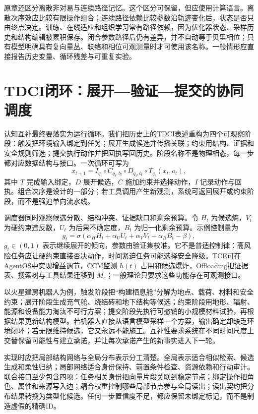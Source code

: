 原章还区分离散非对易与连续路径记忆。这个区分可保留，但应使用计算语言。离散次序效应比较有限操作组合；连续路径依赖比较参数沿轨迹变化后，状态是否只由终点决定。训练、在线适应和组织学习常有路径依赖，因为优化器状态、采样历史和结构编辑被累积保存。闭合参数路径后仍有差异，并不自动等于贝里相位；只有模型明确具有复向量丛、联络和相位可观测量时才可使用该名称。一般情形应直接报告历史变量、循环残差与可重复实验。

\section{TDCI闭环：展开—验证—提交的协同调度}
\label{sec:section_4727}

认知互补最终要落实为运行循环。我们把历史上的TDCI表述重构为四个可观察阶段：触发把环境输入绑定到任务；展开生成候选并传播关联；约束用结构、证据和安全规则筛选；提交执行动作并把回执写回历史。阶段名称不是物理相态，每一步都对应数据结构与接口。一次循环可写为
\[
x_{t+1}=I_{q_t}\circ C_{q_t,b_t}\circ D_{q_t,b_t}\circ T_{q_t}(x_t,o_t),
\]
其中 $T$ 完成输入绑定，$D$ 展开候选，$C$ 施加约束并选择动作，$I$ 记录动作与回执。组合次序是设计的一部分；若工具调用产生新观测，系统可返回展开或约束阶段，而不是强迫单向流水线。

调度器同时观察候选分散、结构冲突、证据缺口和剩余预算。令 $H_t$ 为候选熵，$V_t$ 为硬约束违反数，$U_t$ 为后果不确定度，$B_t$ 为归一化剩余预算。示例控制量为
\[
g_t=\sigma(\alpha_HH_t+\alpha_UU_t+\alpha_VV_t-\alpha_BB_t-\beta),
\]
$g_t\in(0,1)$ 表示继续展开的倾向，参数由验证集校准。它不是普适控制律：高风险任务应让硬约束直接否决动作，时间紧迫任务可能选择安全降级。TCE可在AgentOS中实现增益调节，CCM监测 $h(t)$ 占用和候选爆炸，Offloading把证据表、搜索树与工具结果迁移到 $M_e$；一般理论只要求这些功能存在可观测接口。

以火星建房机器人为例，触发阶段把“构建栖息舱”分解为地点、载荷、材料和安全约束；展开阶段生成充气舱、烧结砖和地下结构等候选；约束阶段用地形、辐射、能源和设备能力淘汰不可行方案；提交阶段先执行可撤销的小规模材料试验，再根据结果更新结构模型。若机器人直接从语言模型采样一个方案，输出确定却缺乏环境闭环；若无限维持候选，它又永远不能施工。互补性要求系统在不同时间尺度上交替保留可能性与建立承诺，并让每次承诺产生的新事实进入下一轮。

实现时应把局部结构网络与全局分布表示分工清楚。全局表示适合相似检索、候选生成和柔性归纳；局部网络适合身份保持、前置条件检查、资源依赖和行动审计。联合接口至少包含四项：任务相关身份把向量片段关联到稳定节点；绑定操作把角色、属性和来源写入边；耦合权重控制哪些局部节点参与全局读出；读出契约把分布结果转换为类型化候选。任何一步置信度不足，都应保留未绑定标记，而不是制造虚假的精确ID。

